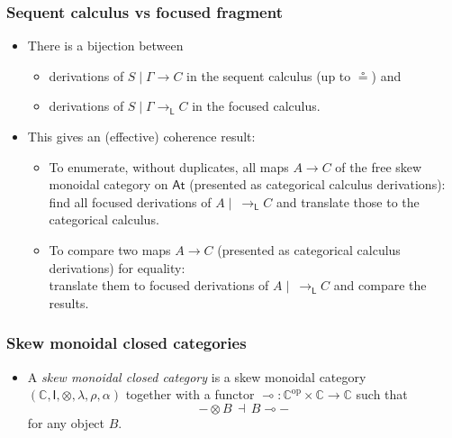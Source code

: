 \documentclass[10pt,t]{beamer}
\newcommand{\I}{\mathsf{I}}
\newcommand{\C}{\mathbb{C}}
\newcommand{\al}{\alpha}
\newcommand{\lam}{\lambda}
\newcommand{\Var}{\mathsf{At}}
\renewcommand{\vdash}{\longrightarrow}
\newcommand{\vdashL}{\vdash_\mathsf{L}}
\newcommand{\lo}{\multimap}
\newcommand{\lolli}{\lo}
\begin{document}

\begin{frame}

\frametitle{Sequent calculus vs focused fragment}

\begin{itemize}

\item There is a bijection between
\begin{itemize}
\item derivations of $S \mid \Gamma \vdash C$
  in the sequent calculus (up to $\circeq$) and 
\item derivations of $S \mid \Gamma \vdashL C$ in the focused calculus.
\end{itemize}

\bigskip

\item This gives an (effective) coherence result:

\begin{itemize}
\item To enumerate, without duplicates, all maps $A \to C$ of the free skew monoidal category on $\Var$ (presented as categorical calculus derivations): \\[9pt]

find all focused derivations of
  $A \mid ~ \vdashL C$ and translate those to the categorical calculus.

\medskip

\item To compare two maps $A \to C$ (presented as categorical calculus
  derivations) for equality: \\[9pt] translate them to focused derivations of
  $A \mid ~ \vdashL C$ and compare the results.


\end{itemize}

\end{itemize}

\end{frame}

\begin{frame}

\frametitle{Skew monoidal closed categories}

\begin{itemize}
\item A \emph{skew monoidal closed category} is a skew monoidal
  category $(\C, \I, \otimes, \lam, \rho, \al)$ together with a
  functor $\lolli : \C^{\mathrm{op}} \times \C \to \C$ such that
\[
{-} \otimes B \, \dashv \, B \lolli {-}
\]
for any object $B$.
\end{itemize}

\end{frame}
\end{document}
